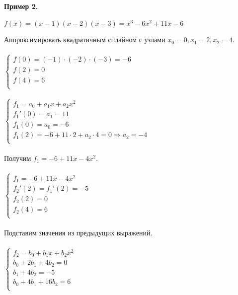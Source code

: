 \documentclass[12pt]{article}
\theoremstyle{definition}
\numberwithin{equation}{section}
\begin{document}
	\noindent \textbf{Пример 2.}
	\begin{center}$f(x) = (x-1)(x-2)(x-3) = x^3-6x^2+11x-6$\end{center}
	Аппроксимировать квадратичным сплайном с узлами $x_0=0, x_1=2, x_2=4$.\\ \\
	$  
	\left\{  
	\begin{array}{lcl}
	f(0)=(-1)\cdot (-2)\cdot (-3)=-6\\
	f(2)=0\\
	f(4)=6\\
	\end{array}   
	\right.  
	$
	\\ \\
	$  
	\left\{  
	\begin{array}{lcl}
	f_1 = a_0+a_1x+a_2x^2\\
	f_1'(0) = a_1 = 11\\
	f_1(0) = a_0 = -6\\
	f_1(2) = -6+11\cdot 2+a_2\cdot 4 = 0 \Rightarrow a_2 = -4\\
	\end{array}   
	\right.  
	$
	\\ \\
	Получим $f_1 = -6+11x-4x^2$. \\ \\
	$  
	\left\{  
	\begin{array}{lcl}
	f_1 = -6+11x-4x^2\\
	f_2'(2) = f_1'(2) = -5\\
	f_2(2) = 0\\
	f_2(4) = 6\\
	\end{array}   
	\right.  
	$
	\\ ~\\
	Подставим значения из предыдущих выражений.\\ \\
	$
	\left\{  
	\begin{array}{lcl}
	f_2 = b_0+b_1x+b_2x^2\\
	b_0+2b_1+4b_2 = 0\\
	b_1+4b_2 = -5\\
	b_0+4b_1+16b_2 = 6\\
	\end{array}   
	\right.  
	$
	\\ \\
\end{document}
